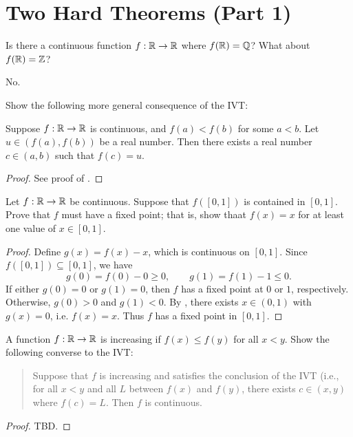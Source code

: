 \section{Two Hard Theorems (Part 1)}

\begin{problem}
  Is there a continuous function $f : \mathbb{R} \to \mathbb{R}$ where $f(\mathbb{R}) = \mathbb{Q}$? What about $f(\mathbb{R}) = \mathbb{Z}$?

  \vspace{\baselineskip}

  No.

\end{problem}

\begin{problem}
  Show the following more general consequence of the IVT:

  Suppose $f: \mathbb{R} \to \mathbb{R}$ is continuous, and $f(a) < f(b)$ for some $a < b$. Let
  $u \in (f(a), f(b))$ be a real number. Then there exists a real number $c \in
  (a, b)$ such that $f(c) = u$.

  \begin{proof} 
    See proof of .
  \end{proof} 
\end{problem}

\begin{problem}
  Let $f : \mathbb{R} \to \mathbb{R}$ be continuous. Suppose that $f([0, 1])$ is contained in $[0, 1]$. Prove that 
  $f$ must have a fixed point; that is, show thaat $f(x) = x$ for at least one value of $x \in [0, 1]$.

  \begin{proof}
    Define $g(x) = f(x) - x$, which is continuous on $[0,1]$.
    Since $f([0,1]) \subseteq [0,1]$, we have
    \[
      g(0) = f(0) - 0 \geq 0, \qquad g(1) = f(1) - 1 \leq 0.
    \]
    If either $g(0) = 0$ or $g(1) = 0$, then $f$ has a fixed point at $0$ or $1$, respectively.
    Otherwise, $g(0) > 0$ and $g(1) < 0$. By ,
    there exists $x \in (0,1)$ with $g(x) = 0$, i.e. $f(x) = x$.
    Thus $f$ has a fixed point in $[0,1]$.
  \end{proof}
\end{problem}

\begin{problem}
  A function $f : \mathbb{R} \to \mathbb{R}$ is increasing if $f(x) \leq f(y)$ for all $x < y$. Show the following converse to the IVT:

  \begin{quote}
    Suppose that $f$ is increasing and satisfies the conclusion of the IVT (i.e., for all $x < y$ and all $L$ between $f(x)$ and $f(y)$, there exists $c \in (x, y)$ where $f(c) = L$.
    Then $f$ is continuous.
  \end{quote}

  \begin{proof}
    TBD.
  \end{proof}

\end{problem}
